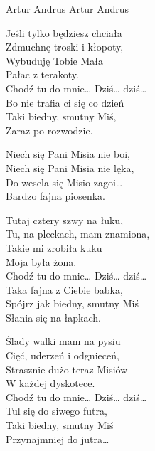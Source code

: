 {Artur Andrus}
{Artur Andrus}
\begin{text}
Jeśli tylko będziesz chciała\\
Zdmuchnę troski i kłopoty,\\
Wybuduję Tobie Mała\\
Pałac z terakoty.\\
Chodź tu do mnie… Dziś… dziś…\\
Bo nie trafia ci się co dzień\\
Taki biedny, smutny Miś,\\
Zaraz po rozwodzie.

\vin Niech się Pani Misia nie boi,\\
\vin Niech się Pani Misia nie lęka,\\
\vin Do wesela się Misio zagoi…\\
\vin Bardzo fajna piosenka.

Tutaj cztery szwy na łuku,\\
Tu, na pleckach, mam znamiona,\\
Takie mi zrobiła kuku\\
Moja była żona.\\
Chodź tu do mnie… Dziś… dziś…\\
Taka fajna z Ciebie babka,\\
Spójrz jak biedny, smutny Miś\\
Słania się na łapkach.

Ślady walki mam na pysiu\\
Cięć, uderzeń i odgnieceń,\\
Strasznie dużo teraz Misiów\\
W każdej dyskotece.\\
Chodź tu do mnie… Dziś… dziś…\\
Tul się do siwego futra,\\
Taki biedny, smutny Miś\\
Przynajmniej do jutra…
\end{text}
\begin{chord}
\end{chord}
